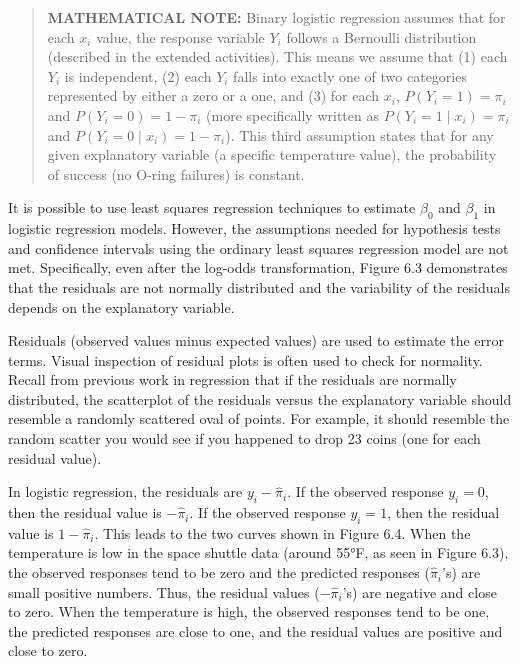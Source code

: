 \documentclass[
]{book}
\begin{document}
\begin{quote}
\textbf{MATHEMATICAL NOTE:}
Binary logistic regression assumes that for each \(x_i\) value, the response variable \(Y_i\) follows a Bernoulli distribution (described in the extended activities). This means we assume that (1) each \(Y_i\) is independent, (2) each \(Y_i\) falls into exactly one of two categories represented by either a zero or a one, and (3) for each \(x_i\), \(P(Y_i = 1) = \pi_i\) and \(P(Y_i = 0) = 1 - \pi_i\) (more specifically written as \(P(Y_i = 1 \mid x_i) = \pi_i\) and \(P(Y_i = 0 \mid x_i) = 1 - \pi_i\)). This third assumption states that for any given explanatory variable (a specific temperature value), the probability of success (no O-ring failures) is constant.
\end{quote}

It is possible to use least squares regression techniques to estimate \(\beta_0\) and \(\beta_1\) in logistic regression models. However, the assumptions needed for hypothesis tests and confidence intervals using the ordinary least squares regression model are not met. Specifically, even after the log-odds transformation, Figure 6.3 demonstrates that the residuals are not normally distributed and the variability of the residuals depends on the explanatory variable.

Residuals (observed values minus expected values) are used to estimate the error terms. Visual inspection of residual plots is often used to check for normality. Recall from previous work in regression that if the residuals are normally distributed, the scatterplot of the residuals versus the explanatory variable should resemble a randomly scattered oval of points. For example, it should resemble the random scatter you would see if you happened to drop 23 coins (one for each residual value).

In logistic regression, the residuals are \(y_i - \hat\pi_i\). If the observed response \(y_i = 0\), then the residual value is \(-\hat\pi_i\). If the observed response \(y_i = 1\), then the residual value is \(1 - \hat\pi_i\). This leads to the two curves shown in Figure 6.4. When the temperature is low in the space shuttle data (around 55°F, as seen in Figure 6.3), the observed responses tend to be zero and the predicted responses (\(\hat\pi_i\)'s) are small positive numbers. Thus, the residual values (\(-\hat\pi_i\)'s) are negative and close to zero. When the temperature is high, the observed responses tend to be one, the predicted responses are close to one, and the residual values are positive and close to zero.
\end{document}
